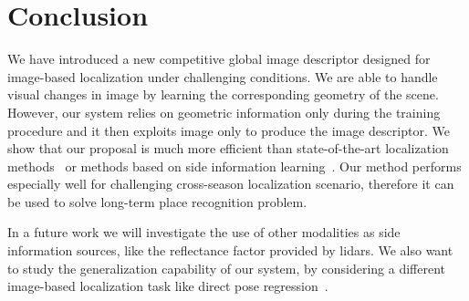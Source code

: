 \section{Conclusion}
\label{sec:conclusion}

We have introduced a new competitive global image descriptor designed for image-based localization under challenging conditions. We are able to handle visual changes in image by learning the corresponding geometry of the scene. However, our system relies on geometric information only during the training procedure and it then exploits image only to produce the image descriptor. We show that our proposal is much more efficient than state-of-the-art localization methods~\cite{Arandjelovic2017, Radenovic2017} or methods based on side information learning~\cite{Hoffman2016}. Our method performs especially well for challenging cross-season localization scenario, therefore it can be used to solve long-term place recognition problem.

In a future work we will investigate the use of other modalities as side information sources, like the reflectance factor provided by lidars. We also want to study the generalization capability of our system, by considering a different image-based localization task like direct pose regression~\cite{Brachmann2018}.